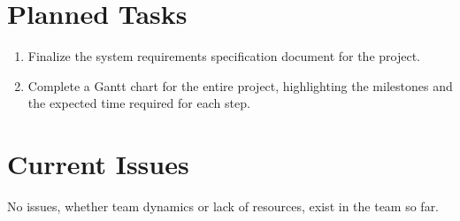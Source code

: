 \documentclass[paper=usletter, fontsize=12pt]{article}
\begin{document}
    \section{Planned Tasks}
    \begin{enumerate}[label=\alph*)]

        \item Finalize the system requirements specification document for the project.

        \item Complete a Gantt chart for the entire project, highlighting the milestones and the expected time required for each step.

    \end{enumerate}


    \section{Current Issues}
    No issues, whether team dynamics or lack of resources, exist in the team so far.

   
\end{document}
